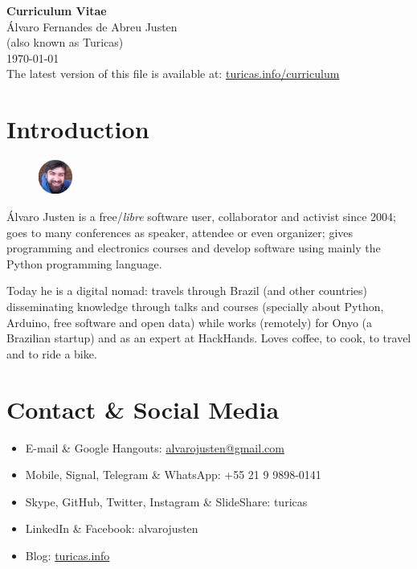 \documentclass[a4paper,11pt]{article}
\begin{document}
\pagestyle{empty}

\begin{center}
 \huge{\textbf{Curriculum Vitae}}
 \\
 \huge{Álvaro Fernandes de Abreu Justen}
 \\
 \small{(also known as Turicas)}
 \large{\\}
 \large{\today}
 \\
 \small{The latest version of this file is available at:
        \href{http://turicas.info/curriculum}{turicas.info/curriculum}}
\end{center}

\newcommand{\titulo}[1]{\section*{#1}}
\renewcommand{\labelitemi}{$\diamond$}
\renewcommand{\labelitemii}{$\rightarrow$}

\titulo{Introduction}
\begin{figure}
	\begin{center}
		\includegraphics[width=0.1\textwidth]{turicas}
	\end{center}
\end{figure}

Álvaro Justen is a free/\textit{libre} software user, collaborator and activist
since 2004; goes to many conferences as speaker, attendee or even organizer;
gives programming and electronics courses and develop software using mainly the
Python programming language.

Today he is a digital nomad: travels through Brazil (and other countries)
disseminating knowledge through talks and courses (specially about Python,
Arduino, free software and open data) while works (remotely) for Onyo (a
Brazilian startup) and as an expert at HackHands. Loves coffee, to cook, to
travel and to ride a bike.


\titulo{Contact \& Social Media}
	\begin{itemize}
		\renewcommand{\labelitemi}{}
		\item E-mail \& Google Hangouts: \url{alvarojusten@gmail.com}
		\item Mobile, Signal, Telegram \& WhatsApp: +55 21 9 9898-0141
		\item Skype, GitHub, Twitter, Instagram \& SlideShare: turicas
		\item LinkedIn \& Facebook: alvarojusten
		\item Blog: \href{http://turicas.info/}{turicas.info}
	\end{itemize}
\end{document}
